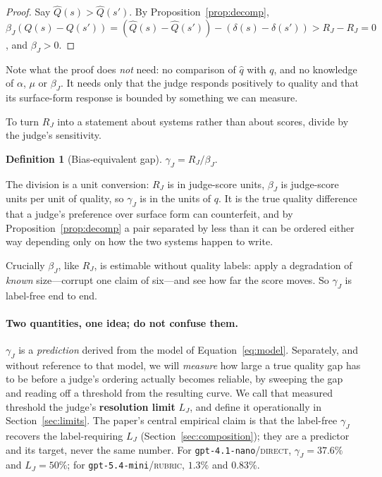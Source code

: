 \documentclass{article}
\theoremstyle{plain}
\theoremstyle{definition}
\newtheorem{definition}[theorem]{Definition}
\newcommand{\qhat}{\hat{q}}
\newcommand{\Qhat}{\hat{Q}}
\newcommand{\bgap}{\gamma}
\newcommand{\rlim}{L}
\begin{document}
\begin{proof}
Say $\Qhat(s)>\Qhat(s')$. By Proposition~\ref{prop:decomp},
$\beta_J(Q(s)-Q(s')) = (\Qhat(s)-\Qhat(s')) - (\delta(s)-\delta(s')) > R_J-R_J = 0$, and
$\beta_J>0$.
\end{proof}

Note what the proof does \emph{not} need: no comparison of $\qhat$ with $q$, and no knowledge
of $\alpha$, $\mu$ or $\beta_J$. It needs only that the judge responds positively to quality
and that its surface-form response is bounded by something we can measure.

To turn $R_J$ into a statement about systems rather than about scores, divide by the judge's
sensitivity.

\begin{definition}[Bias-equivalent gap]
$\bgap_J = R_J/\beta_J$.
\end{definition}

The division is a unit conversion: $R_J$ is in judge-score units, $\beta_J$ is judge-score
units per unit of quality, so $\bgap_J$ is in the units of $q$. It is the true quality
difference that a judge's preference over surface form can counterfeit, and by
Proposition~\ref{prop:decomp} a pair separated by less than it can be ordered either way
depending only on how the two systems happen to write.

Crucially $\beta_J$, like $R_J$, is estimable without quality labels: apply a degradation of
\emph{known} size---corrupt one claim of six---and see how far the score moves. So $\bgap_J$ is
label-free end to end.

\paragraph{Two quantities, one idea; do not confuse them.} $\bgap_J$ is a \emph{prediction}
derived from the model of Equation~\ref{eq:model}. Separately, and without reference to that
model, we will \emph{measure} how large a true quality gap has to be before a judge's ordering
actually becomes reliable, by sweeping the gap and reading off a threshold from the resulting
curve. We call that measured threshold the judge's \textbf{resolution limit} $\rlim_J$, and
define it operationally in Section~\ref{sec:limits}. The paper's central empirical claim is
that the label-free $\bgap_J$ recovers the label-requiring $\rlim_J$
(Section~\ref{sec:composition}); they are a predictor and its target, never the same number.
For \texttt{gpt-4.1-nano}/\textsc{direct}, $\bgap_J = 37.6\%$ and $\rlim_J = 50\%$; for
\texttt{gpt-5.4-mini}/\textsc{rubric}, $1.3\%$ and $0.83\%$.
\end{document}
